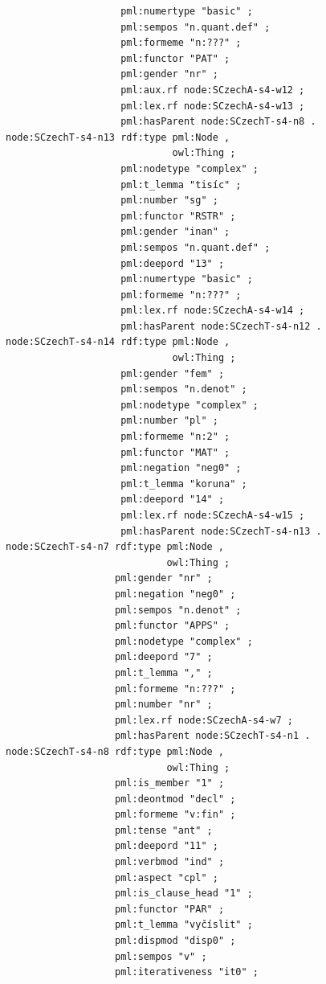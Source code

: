 \begin{listing}[ht]
\begin{verbatim}
                    pml:numertype "basic" ;
                    pml:sempos "n.quant.def" ;
                    pml:formeme "n:???" ;
                    pml:functor "PAT" ;
                    pml:gender "nr" ;
                    pml:aux.rf node:SCzechA-s4-w12 ;
                    pml:lex.rf node:SCzechA-s4-w13 ;
                    pml:hasParent node:SCzechT-s4-n8 .
node:SCzechT-s4-n13 rdf:type pml:Node ,
                             owl:Thing ;
                    pml:nodetype "complex" ;
                    pml:t_lemma "tisíc" ;
                    pml:number "sg" ;
                    pml:functor "RSTR" ;
                    pml:gender "inan" ;
                    pml:sempos "n.quant.def" ;
                    pml:deepord "13" ;
                    pml:numertype "basic" ;
                    pml:formeme "n:???" ;
                    pml:lex.rf node:SCzechA-s4-w14 ;
                    pml:hasParent node:SCzechT-s4-n12 .
node:SCzechT-s4-n14 rdf:type pml:Node ,
                             owl:Thing ;
                    pml:gender "fem" ;
                    pml:sempos "n.denot" ;
                    pml:nodetype "complex" ;
                    pml:number "pl" ;
                    pml:formeme "n:2" ;
                    pml:functor "MAT" ;
                    pml:negation "neg0" ;
                    pml:t_lemma "koruna" ;
                    pml:deepord "14" ;
                    pml:lex.rf node:SCzechA-s4-w15 ;
                    pml:hasParent node:SCzechT-s4-n13 .
node:SCzechT-s4-n7 rdf:type pml:Node ,
                            owl:Thing ;
                   pml:gender "nr" ;
                   pml:negation "neg0" ;
                   pml:sempos "n.denot" ;
                   pml:functor "APPS" ;
                   pml:nodetype "complex" ;
                   pml:deepord "7" ;
                   pml:t_lemma "," ;
                   pml:formeme "n:???" ;
                   pml:number "nr" ;
                   pml:lex.rf node:SCzechA-s4-w7 ;
                   pml:hasParent node:SCzechT-s4-n1 .
node:SCzechT-s4-n8 rdf:type pml:Node ,
                            owl:Thing ;
                   pml:is_member "1" ;
                   pml:deontmod "decl" ;
                   pml:formeme "v:fin" ;
                   pml:tense "ant" ;
                   pml:deepord "11" ;
                   pml:verbmod "ind" ;
                   pml:aspect "cpl" ;
                   pml:is_clause_head "1" ;
                   pml:functor "PAR" ;
                   pml:t_lemma "vyčíslit" ;
                   pml:dispmod "disp0" ;
                   pml:sempos "v" ;
                   pml:iterativeness "it0" ;

\end{verbatim}
\end{listing}
